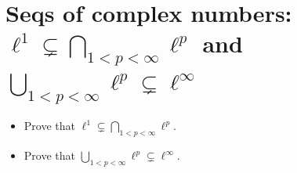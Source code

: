 \documentclass{qlnotes-export}
\begin{document}
\section{\texorpdfstring{Seqs of complex numbers: \(\ell^{1} \subsetneq \bigcap_{1 < p < \infty}\ell^{p}\) and \(\bigcup_{1 < p < \infty}\ell^{p} \subsetneq \ell^{\infty}\)}{Seqs of complex numbers: \textbackslash ell\^{}\{1\} \textbackslash subsetneq \textbackslash bigcap\_\{1 \textless{} p \textless{} \textbackslash infty\}\textbackslash ell\^{}\{p\} and \textbackslash bigcup\_\{1 \textless{} p \textless{} \textbackslash infty\}\textbackslash ell\^{}\{p\} \textbackslash subsetneq \textbackslash ell\^{}\{\textbackslash infty\}}}\label{seqs-of-complex-numbers-ell1subsetneqbigcap_1pinftyellp-and-bigcup_1pinftyellpsubsetneqellinfty}

\begin{itemize}
\item
  Prove that \(\ell^{1} \subsetneq \bigcap_{1 < p < \infty}\ell^{p}\).
\item
  Prove that \(\bigcup_{1 < p < \infty}\ell^{p} \subsetneq \ell^{\infty}\).
\end{itemize}
\end{document}
